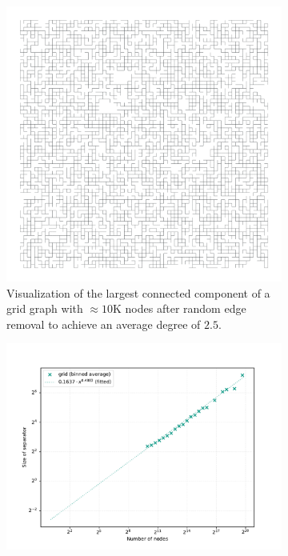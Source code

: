 \begin{figure}
	\centering
	\begin{subfigure}{0.35\linewidth}
		\centering
		\includegraphics[width=\linewidth]{graphics/grid_avg_deg.png}
		\caption{Visualization of the largest connected component of a grid graph with \(\approx 10\text{K}\) nodes after random edge removal to achieve an average degree of \(2.5\).}
		\label{fig:sparse_grid_viz} %
	\end{subfigure}
	\hfill
	\begin{subfigure}{0.55\linewidth}
		\centering
		\includegraphics[width=\linewidth]{graphics/sep_grid_avg_deg.png}

\end{subfigure}
\end{figure}
